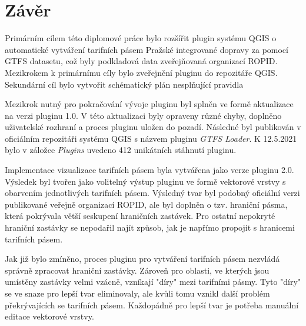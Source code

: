 \chapter*{Závěr}
\label{6-zaver}

Primárním cílem této diplomové práce bylo rozšířit plugin systému QGIS 
o automatické vytváření tarifních pásem Pražské integrované dopravy za pomocí GTFS datasetu,
což byly podkladová data zveřejňovaná organizací ROPID. Mezikrokem k primárnímu cíly
bylo zveřejnění pluginu do repozitáře QGIS. Sekundární cíl bylo vytvořit schématický plán
nesplňující pravidla 


Mezikrok nutný pro pokračování vývoje pluginu byl splněn ve formě aktualizace na verzi pluginu 1.0.
V této aktualizaci byly opraveny různé chyby, doplněno uživatelské rozhraní a proces pluginu uložen do pozadí. 
Následné byl publikován v oficiálním repozitáři systému QGIS s názvem pluginu \textit{GTFS Loader}. 
K 12.5.2021 bylo v záložce \textit{Plugins} uvedeno 412 unikátních stáhnutí pluginu.

Implementace vizualizace tarifních pásem byla vytvářena jako verze pluginu 2.0. Výsledek
byl tvořen jako volitelný výstup pluginu ve formě vektorové vrstvy s obarvením jednotlivých tarifních pásem.
Výsledný tvar byl podobný oficiální verzi publikované veřejně organizací ROPID, ale byl doplněn o tzv. hraniční pásma,
která pokrývala větší seskupení hraničních zastávek. Pro ostatní nepokryté hraniční zastávky 
se nepodařil najít způsob, jak je napřímo propojit s hranicemi tarifních pásem.

Jak již bylo zmíněno, proces pluginu pro vytváření tarifních pásem nezvládá správně zpracovat hraniční zastávky.
Zároveň pro oblasti, ve kterých jsou umístěny zastávky velmi vzácně, vzníkají "díry" mezi tarifními pásmy.
Tyto "díry" se ve snaze pro lepší tvar eliminovaly, ale kvůli tomu vznikl další problém překrývajících se tarifních pásem.
Každopádně pro lepší tvar je potřeba manuální editace vektorové vrstvy.

